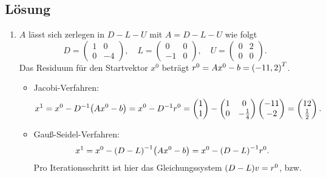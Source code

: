 \documentclass{exercise}
\begin{document}
    \subsection*{Lösung}
    \begin{enumerate}
        \item \(A\) lässt sich zerlegen in \(D - L - U\) mit \(A = D - L - U\) wie folgt
        \[
            D = \begin{pmatrix}
                1 & 0\\
                0 & -4
            \end{pmatrix}, \quad L = \begin{pmatrix}
                0 & 0\\
                -1 & 0
            \end{pmatrix}, \quad U = \begin{pmatrix}
                0 & 2\\
                0 & 0
            \end{pmatrix}.
        \]
        Das Residuum für den Startvektor \(x^0\) beträgt \(r^0 = Ax^0 - b = \parentheses*{-11, 2}^T\).
        \begin{itemize}
            \item Jacobi-Verfahren:
            \[
                x^1 = x^0 - D^{-1}\parentheses*{Ax^0 - b} = x^0 - D^{-1}r^0 = \begin{pmatrix}
                    1\\
                    1
                \end{pmatrix} - \begin{pmatrix}
                    1 & 0\\
                    0 & -\frac{1}{4}
                \end{pmatrix}\begin{pmatrix}
                    -11\\
                    -2
                \end{pmatrix} = \begin{pmatrix}
                    12\\
                    \frac{1}{2}
                \end{pmatrix}.
            \]
            \item Gauß-Seidel-Verfahren:
            \[
                x^1 = x^0 - \parentheses*{D - L}^{-1}\parentheses*{Ax^0 - b} = x^0 - \parentheses*{D - L}^{-1}r^0.
            \]
            Pro Iterationsschritt ist hier das Gleichungssystem \(\parentheses*{D - L}v = r^0\), bzw.

\end{itemize}
\end{enumerate}
\end{document}
